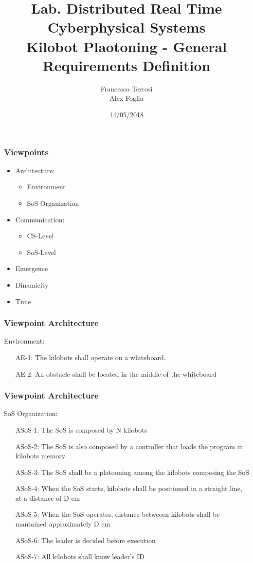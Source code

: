 \documentclass{beamer}
\title[Kilobot Platooning - General Requirements]{Lab. Distributed Real Time Cyberphysical Systems\\Kilobot Plaotoning - General Requirements Definition} %
\author{Francesco Terrosi \\Alex Foglia} %
\institute[UNIFI] %
{
Universit\`a di Firenze \\ %
}
\date{14/05/2018} %
\begin{document}
\begin{frame}
\titlepage %
\end{frame}


\begin{frame}
\frametitle{Viewpoints}
\begin{itemize}
	\item Architecture:
	\begin{itemize}
		\item Environment
		\item SoS Organization
	\end{itemize}
	\item Communication:
	\begin{itemize}
		\item CS-Level
		\item SoS-Level
	\end{itemize}
	\item Emergence
	\item Dinamicity
	\item Time
\end{itemize}
\end{frame}

\begin{frame}
\frametitle{Viewpoint Architecture}
Environment:
	\begin{enumerate}[align=left]
		\item [AE-1:] The kilobots shall operate on a whiteboard.
		\item [AE-2:] An obstacle shall be located in the middle of the whiteboard
	\end{enumerate}
\end{frame}

\begin{frame}
\frametitle{Viewpoint Architecture}
SoS Organization:

\begin{enumerate}[align=left]
	\item[ASoS-1:] The SoS is composed by N kilobots
	\item  [ASoS-2:] The SoS is also composed by a controller that loads the program in kilobots memory
	\item [ASoS-3:] The SoS shall be a platooning among the kilobots composing the SoS
	\item [ASoS-4:] When the SoS starts, kilobots shall be positioned in a straight line, at a distance of D cm
	\item [ASoS-5:] When the SoS operates, distance betweeen kilobots shall be mantained approximately D cm
	\item [ASoS-6:] The leader is decided before execution
	\item [ASoS-7:] All kilobots shall know leader's ID
\end{enumerate}
\end{frame}
\end{document}
